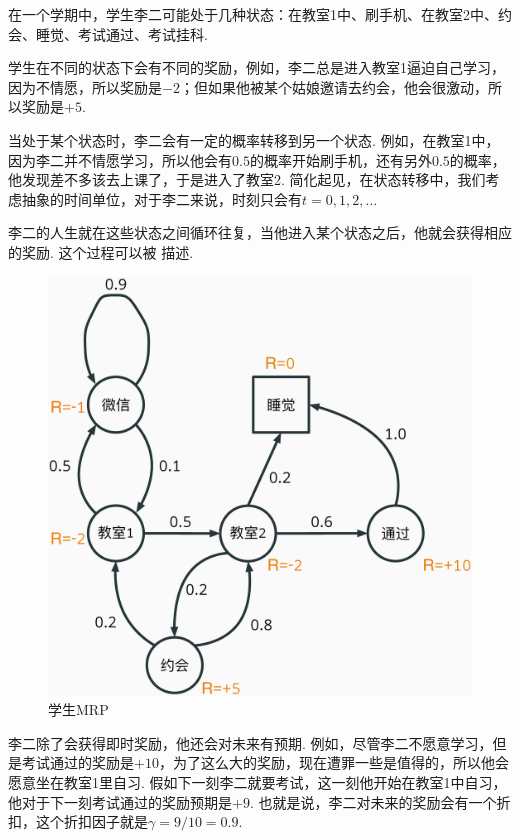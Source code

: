 \begin{example}[李二的MRP]\label{ex:lier-MRP}
在一个学期中，学生李二可能处于几种状态：在教室1中、刷手机、在教室2中、约会、睡觉、考试通过、考试挂科. 

学生在不同的状态下会有不同的奖励，例如，李二总是进入教室1逼迫自己学习，因为不情愿，所以奖励是$-2$；但如果他被某个姑娘邀请去约会，他会很激动，所以奖励是$+5$. 

当处于某个状态时，李二会有一定的概率转移到另一个状态. 例如，在教室1中，因为李二并不情愿学习，所以他会有$0.5$的概率开始刷手机，还有另外$0.5$的概率，他发现差不多该去上课了，于是进入了教室2. 简化起见，在状态转移中，我们考虑抽象的时间单位，对于李二来说，时刻只会有$t=0,1,2,\dots$

李二的人生就在这些状态之间循环往复，当他进入某个状态之后，他就会获得相应的奖励. 这个过程可以被 描述. 
\begin{figure}[ht]
    \centering
    \includegraphics[height=0.4\textheight]{Figures/Markov-chain/STR.eps}
    \caption{学生MRP}
    \label{fig:student-MRP}
\end{figure}

李二除了会获得即时奖励，他还会对未来有预期. 例如，尽管李二不愿意学习，但是考试通过的奖励是$+10$，为了这么大的奖励，现在遭罪一些是值得的，所以他会愿意坐在教室1里自习. 假如下一刻李二就要考试，这一刻他开始在教室1中自习，他对于下一刻考试通过的奖励预期是$+9$. 也就是说，李二对未来的奖励会有一个折扣，这个折扣因子就是$\gamma=9/10=0.9$.
\end{example}

